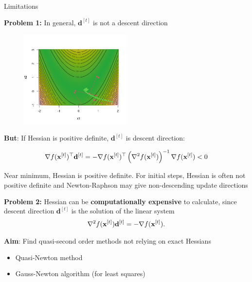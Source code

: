 \documentclass[11pt,compress,t,notes=noshow, xcolor=table]{beamer}
\begin{document}
\begin{vbframe}{Limitations}

\textbf{Problem 1:} In general, $\mathbf{d}^{[t]}$ is not a descent direction

\vspace*{-0.75\baselineskip}

\begin{figure}
    \centering
    \includegraphics[width=0.5\textwidth]{slides/05-multivariate-second-order/figure_man/NR_2.png}
\end{figure}

\begin{footnotesize}
\textbf{But}: If Hessian is positive definite, $\mathbf{d}^{[t]}$ is descent direction:

\begin{equation*}
    \nabla f(\mathbf{x}^{[t]})^\top \mathbf{d}^{[t]} = - \nabla f(\mathbf{x}^{[t]})^\top \left(\nabla^2 f(\mathbf{x}^{[t]})\right)^{-1} \nabla f(\mathbf{x}^{[t]}) < 0
\end{equation*}

Near minimum, Hessian is positive definite.
For initial steps, Hessian is often not positive definite and Newton-Raphson may give non-descending update directions
\end{footnotesize}

\framebreak

\textbf{Problem 2:} Hessian can be \textbf{computationally expensive} to calculate, since descent direction $\mathbf{d}^{[t]}$ is the solution of the linear system
\begin{equation*}
    \nabla^2 f(\mathbf{x}^{[t]}) \mathbf{d}^{[t]} = - \nabla f(\mathbf{x}^{[t]}).
\end{equation*}


\lz

\textbf{Aim}: Find quasi-second order methods not relying on exact Hessians
\begin{itemize}
    \item Quasi-Newton method
    \item Gauss-Newton algorithm (for least squares)
\end{itemize}

\end{vbframe}
\end{document}
